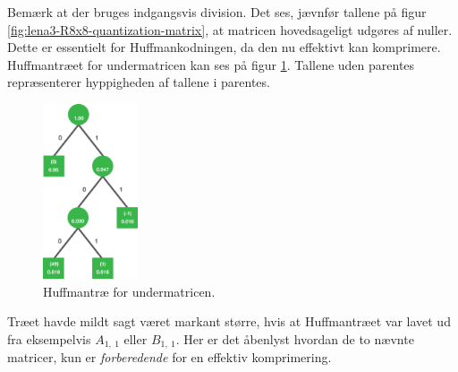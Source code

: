 Bemærk at der bruges indgangsvis division. Det ses, jævnfør tallene på figur \ref{fig:lena3-R8x8-quantization-matrix}, at matricen hovedsageligt udgøres af nuller. Dette er essentielt for Huffmankodningen, da den nu effektivt kan komprimere. Huffmantræet for undermatricen kan ses på figur \ref{fig:Huffman-8x8-visuel}. Tallene uden parentes repræsenterer hyppigheden af tallene i parentes.
\begin{figure}[htbp]
\centering
\includegraphics[width=0.25\textwidth]{Billeder/LenaAnvendelse/HUFFMAN/Huffman-8x8.png}
\caption{Huffmantræ for undermatricen.}
\label{fig:Huffman-8x8-visuel}
\end{figure}

Træet havde mildt sagt været markant større, hvis at Huffmantræet var lavet ud fra eksempelvis
 $A_{1,\ 1}$ eller $B_{1,\ 1}$. Her er det åbenlyst hvordan de to nævnte matricer, kun er \textit{forberedende} for en effektiv komprimering.

